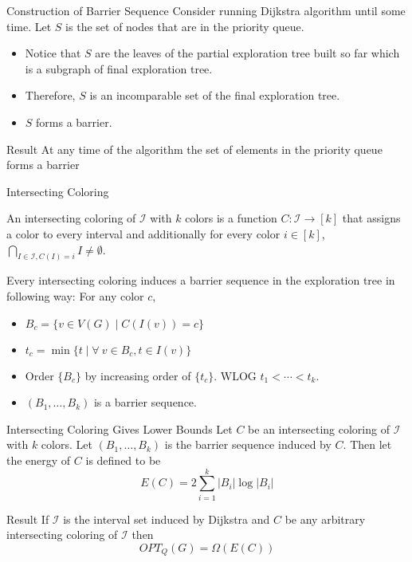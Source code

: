 \documentclass[10pt]{beamer}
\begin{document}
\begin{frame}{Construction of Barrier Sequence}
	Consider running Dijkstra algorithm until some time. Let $S$ is the set of nodes that are in the priority queue.\pause 
	\begin{itemize}
		\item Notice that $S$ are the leaves of the partial exploration tree built so far which is a subgraph of final exploration tree.\pause 
		\item Therefore, $S$ is an incomparable set of the final exploration tree.
		\item $S$ forms a barrier.
	\end{itemize}\pause \vfill

	\begin{alertblock}{Result}
		At any time of the algorithm the set of elements in the priority queue forms a barrier
	\end{alertblock}
\end{frame}
\begin{frame}{Intersecting Coloring}
	\begin{definition}
		An intersecting coloring of $\mathcal{I}$ with $k$ colors is a function $C:\mathcal{I}\to [k]$ that assigns a color to every interval and additionally for every color $i\in[k]$, $\bigcap\limits_{I\in\mathcal{I}, C(I)=i}I\neq \emptyset$.
	\end{definition}\pause \vfill

	Every intersecting coloring induces a barrier sequence in the exploration tree in following way: For any color $c$,\pause  \begin{itemize}
		\item  $B_c=\{v\in V(G)\mid C(I(v))=c\}$\pause 
		\item $t_c=\min\{t\mid \forall\ v\in B_c, t\in I(v)\}$\pause 
		\item Order $\{B_c\}$ by increasing order of $\{t_c\}$. WLOG $t_1<\cdots <t_k$.\pause 
		\item $(B_1,\dots, B_k)$ is a barrier sequence.
	\end{itemize}
\end{frame}

\begin{frame}{Intersecting Coloring Gives Lower Bounds}
	Let $C$ be an intersecting coloring of $\mathcal{I}$ with $k$ colors.
	Let $(B_1,\dots, B_k)$ is the barrier sequence induced by $C$. Then let the energy of $C$ is defined to be $$E(C)=2\sum\limits_{i=1}^k|B_i|\log |B_i|$$\pause 
	\vfill

	\begin{alertblock}{Result}
		If $\mathcal{I}$ is the interval set induced by Dijkstra and $C$ be any arbitrary intersecting coloring of $\mathcal{I}$ then $$OPT_Q(G)=\Omega(E(C))$$
	\end{alertblock}
\end{frame}
\end{document}
